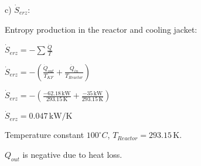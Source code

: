 c) \( \dot{S}_{erz} \):  

Entropy production in the reactor and cooling jacket:  

\( \dot{S}_{erz} = -\sum \frac{\dot{Q}}{T} \)  

\( \dot{S}_{erz} = -\left( \frac{\dot{Q}_{out}}{T_{KF}} + \frac{\dot{Q}_{in}}{T_{Reactor}} \right) \)  

\( \dot{S}_{erz} = -\left( \frac{-62.18 \, \text{kW}}{293.15 \, \text{K}} + \frac{-35 \, \text{kW}}{293.15 \, \text{K}} \right) \)  

\( \dot{S}_{erz} = 0.047 \, \text{kW/K} \)  

Temperature constant \( 100^\circ C \), \( T_{Reactor} = 293.15 \, \text{K} \).  

\( Q_{out} \) is negative due to heat loss.